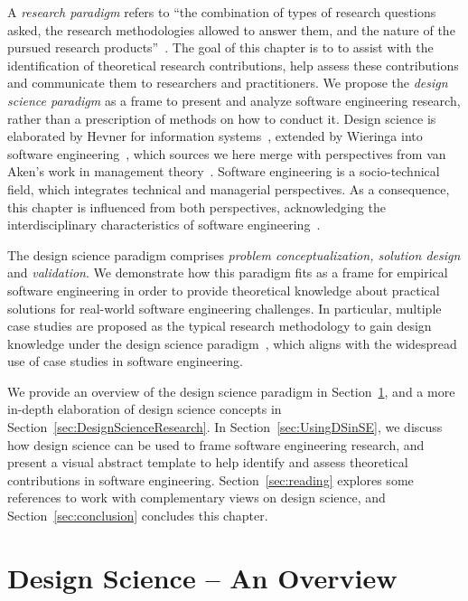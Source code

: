 \documentclass[graybox]{svmult}
\begin{document}
A \emph{research paradigm} refers to ``the combination of types of research questions asked, the research methodologies allowed to answer them, and the nature of the pursued research products''~\cite{van_aken_management_2004}. The goal of  this chapter is to  to assist with the identification of theoretical research contributions, help assess these contributions and communicate them to researchers and practitioners. 
We propose the \emph{design science paradigm} as a frame to present and analyze software engineering research, rather than a prescription of methods on how to conduct it. 
Design science is elaborated by Hevner for information systems~\cite{hevner_design_2004}, extended by Wieringa into software engineering~\cite{wieringa_what_2014}, which sources we here merge with perspectives from van Aken's work in management theory~\cite{van_aken_management_2004}. Software engineering is a socio-technical field, which integrates technical and managerial perspectives. As a consequence, this chapter is influenced from both perspectives, acknowledging the interdisciplinary characteristics of software engineering~\cite{Mendez2019}. 

The design science paradigm comprises \emph{problem conceptualization, solution design} and \emph{validation}. We demonstrate how this paradigm fits as a frame for empirical software engineering in order to provide theoretical knowledge about practical solutions for real-world software engineering challenges. In particular, multiple case studies are proposed as the typical research methodology to gain design knowledge under the design science paradigm~\cite{van_aken_management_2004}, which aligns with the widespread use of case studies in software engineering. 

We provide an overview of the design science paradigm in Section~\ref{sec:overview}, and a more in-depth elaboration of design science concepts in Section~\ref{sec:DesignScienceResearch}. In Section~\ref{sec:UsingDSinSE}, we discuss how design science can be used to frame software engineering research, and present a visual abstract template to help identify and assess theoretical contributions in software engineering. Section~\ref{sec:reading} explores some references to work with complementary views on design science, and Section~\ref{sec:conclusion} concludes this chapter.


\section{Design Science -- An Overview}
\label{sec:overview}
\end{document}

